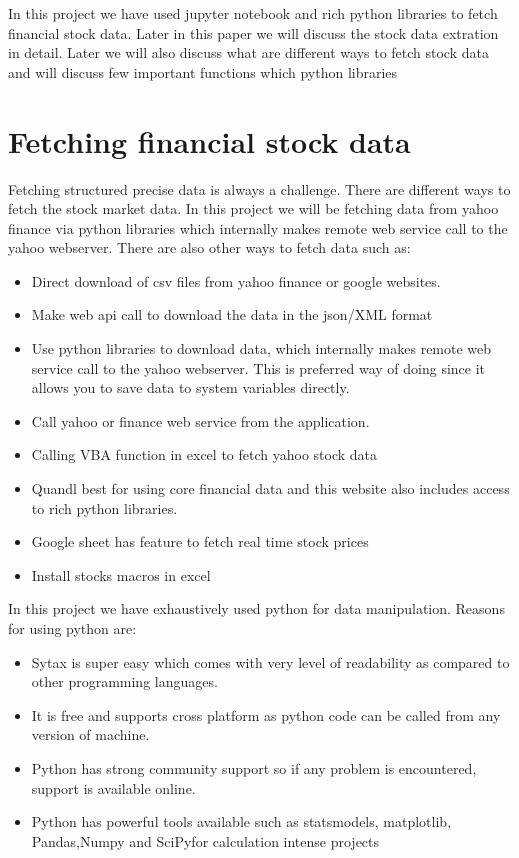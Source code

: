\indent
In this project we have used jupyter notebook and rich python libraries to fetch financial stock data. Later in this paper we will discuss the stock data 
extration in detail. Later we will also discuss what are different ways to fetch stock data and will discuss few important functions which python libraries 
 
\section{Fetching financial stock data}

Fetching structured precise data is always a challenge. There are different ways to fetch the stock market data. In this project we will be fetching data from yahoo finance via python libraries which internally makes 
remote web service call to the yahoo webserver. There are also other ways to fetch data such as:

\begin{itemize}
  \item Direct download of csv files from yahoo finance or google websites.
  \item Make web api call to download the data in the json/XML format
  \item Use python libraries to download data, which internally makes remote web service call to the yahoo webserver. This is preferred way of doing since it allows you to save data to system variables directly. 
  \item Call yahoo or finance web service from the application. 
  \item Calling VBA function in excel to fetch yahoo stock data 
  \item Quandl best for using core financial data and this website also includes access to rich python libraries. 
  \item Google sheet has feature to fetch real time stock prices
  \item Install stocks macros in excel 
\end{itemize}

In this project we have exhaustively used python for data manipulation. Reasons for using python are:

\begin{itemize}
  \item Sytax is super easy which comes with very level of readability as compared to other programming languages.
  \item It is free and supports cross platform as python code can be called from any version of machine.
  \item Python has strong community support so if any problem is encountered, support is available online. 
  \item Python has powerful tools available such as statsmodels, matplotlib, Pandas,Numpy and SciPyfor calculation intense projects
\end{itemize}

